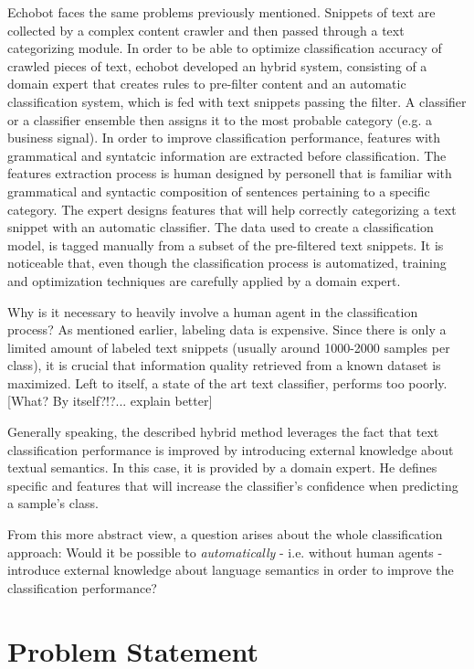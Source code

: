 Echobot faces the same problems previously mentioned. Snippets of text are collected by a complex content crawler and then passed through a text categorizing module. In order to be able to optimize classification accuracy of crawled pieces of text, echobot developed an hybrid system, consisting of a domain expert that creates rules to pre-filter content and an automatic classification system, which is fed with text snippets passing the filter. A classifier or a classifier ensemble then assigns it to the most probable category (e.g. a business signal). In order to improve classification performance, features with grammatical and syntatcic information are extracted before classification. The features extraction process is human designed by personell that is familiar with grammatical and syntactic composition of sentences pertaining to a specific category. The expert designs features that will help correctly categorizing a text snippet with an automatic classifier. The data used to create a classification model, is tagged manually from a subset of the pre-filtered text snippets. It is noticeable that, even though the classification process is automatized, training and optimization techniques are carefully applied by a domain expert. 

Why is it necessary to heavily involve a human agent in the classification process? As mentioned earlier, labeling data is expensive. Since there is only a limited amount of labeled text snippets (usually around 1000-2000 samples per class), it is crucial that information quality retrieved from a known dataset is maximized. Left to itself, a state of the art text classifier, performs too poorly. [What? By itself?!?... explain better]

Generally speaking, the described hybrid method leverages the fact that text classification performance is improved by introducing external knowledge about textual semantics. In this case, it is provided by a domain expert.  He defines specific and features that will increase the classifier's confidence when predicting a sample's class. 

From this more abstract view, a question arises about the whole classification approach: Would it be possible to \textit{automatically} - i.e. without human agents - introduce external knowledge about language semantics in order to improve the classification performance?

\section{Problem Statement}

